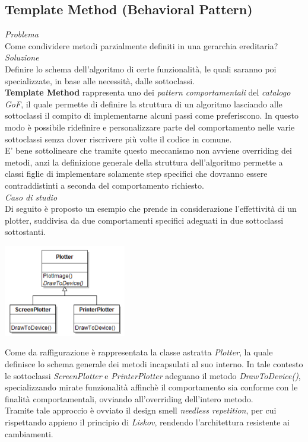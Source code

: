 \documentclass{article}
\begin{document}
\subsection*{Template Method (Behavioral Pattern)}
\large
\textit{Problema}\\
Come condividere metodi parzialmente definiti in una gerarchia ereditaria?\vspace*{14pt}\\
\textit{Soluzione}\\
Definire lo schema dell'algoritmo di certe funzionalità, le quali saranno poi specializzate, in base alle necessità, dalle sottoclassi.\vspace*{14pt}\\
\textbf{Template Method} rappresenta uno dei \textit{pattern comportamentali} del \textit{catalogo GoF}, il quale permette di definire la struttura di un algoritmo lasciando alle sottoclassi il compito di implementarne alcuni passi come preferiscono. In questo modo è possibile ridefinire e personalizzare parte del comportamento nelle varie sottoclassi senza dover riscrivere più volte il codice in comune.\vspace*{7pt}\\
E' bene sottolineare che tramite questo meccanismo non avviene overriding dei metodi, anzi la definizione generale della struttura dell'algoritmo permette a classi figlie di implementare solamente step specifici che dovranno essere contraddistinti a seconda del comportamento richiesto.\vspace*{14pt}\\
\textit{Caso di studio}\\
Di seguito è proposto un esempio che prende in considerazione l'effettività di un plotter, suddivisa da due comportamenti specifici adeguati in due sottoclassi sottostanti.
\begin{center}
    \includegraphics[width=0.4\textwidth]{foto 5.png}
\end{center}\vspace*{7pt}
Come da raffigurazione è rappresentata la classe astratta \textit{Plotter}, la quale definisce lo schema generale dei metodi incapsulati al suo interno. In tale contesto le sottoclassi \textit{ScreenPlotter} e \textit{PrinterPlotter} adeguano il metodo \textit{DrawToDevice()}, specializzando mirate funzionalità affinchè il comportamento sia conforme con le finalità comportamentali, ovviando all'overriding dell'intero metodo.\vspace*{7pt}\\
Tramite tale approccio è ovviato il design smell \textit{needless repetition}, per cui rispettando appieno il principio di \textit{Liskov}, rendendo l'architettura resistente ai cambiamenti.
\end{document}
